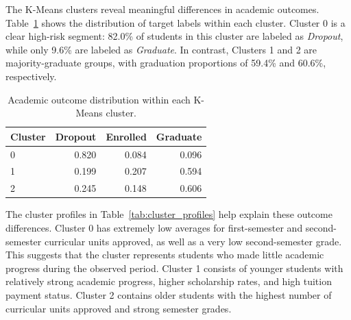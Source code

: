 \documentclass{article}
\begin{document}
The K-Means clusters reveal meaningful differences in academic outcomes. Table~\ref{tab:cluster_outcomes} shows the distribution of target labels within each cluster. Cluster 0 is a clear high-risk segment: 82.0\% of students in this cluster are labeled as \textit{Dropout}, while only 9.6\% are labeled as \textit{Graduate}. In contrast, Clusters 1 and 2 are majority-graduate groups, with graduation proportions of 59.4\% and 60.6\%, respectively.

\begin{table}[t]
\centering
\caption{Academic outcome distribution within each K-Means cluster.}
\label{tab:cluster_outcomes}
\begin{tabular}{lrrr}
\toprule
Cluster & Dropout & Enrolled & Graduate \\
\midrule
0 & 0.820 & 0.084 & 0.096 \\
1 & 0.199 & 0.207 & 0.594 \\
2 & 0.245 & 0.148 & 0.606 \\
\bottomrule
\end{tabular}
\end{table}

The cluster profiles in Table~\ref{tab:cluster_profiles} help explain these outcome differences. Cluster 0 has extremely low averages for first-semester and second-semester curricular units approved, as well as a very low second-semester grade. This suggests that the cluster represents students who made little academic progress during the observed period. Cluster 1 consists of younger students with relatively strong academic progress, higher scholarship rates, and high tuition payment status. Cluster 2 contains older students with the highest number of curricular units approved and strong semester grades.

\begin{table}[t]
\centering
\caption{Selected feature averages for each K-Means cluster.}
\label{tab:cluster_profiles}
\end{table}
\end{document}
